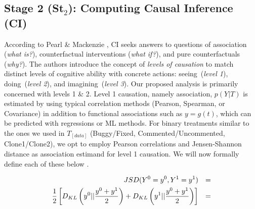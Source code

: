 \subsection{Stage 2 (St$_2$): Computing Causal Inference (CI)}
According to Pearl \& Mackenzie \citep{Pearl2018Causality}, CI seeks answers to questions of association (\textit{what is?}), counterfactual interventions (\textit{what if?}), and pure counterfactuals (\textit{why?}). The authors introduce the concept of \textit{levels of causation} to match distinct levels of cognitive ability with concrete actions: seeing~(\textit{level 1}), doing~(\textit{level 2}), and imagining~(\textit{level 3}). Our proposed analysis is primarily concerned with levels 1 \& 2. Level 1 causation, namely association, $p(Y|T)$ is estimated by using typical correlation methods (\eg Pearson, Spearman, or Covariance) in addition to functional associations such as $y=g(t)$, which can be predicted with regressions or ML methods. For binary treatments similar to the ones we used in $T_{[data]}$ (\eg Buggy/Fixed, Commented/Uncommented, Clone1/Clone2), we opt to employ Pearson correlations and Jensen-Shannon distance as association estimand for level 1 causation. We will now formally define each of these below .


\begin{subequations}
    {%
    \begin{align}
     JSD(Y^{0}=y^0,Y^{1}=y^1) &&= \label{eq:js_divergence-1}\\
     \frac{1}{2}\left[ D_{KL}\left(y^0||\frac{y^0+y^1}{2}\right) + D_{KL}\left(y^1||\frac{y^0+y^1}{2}\right)\right] &&= \label{eq:js_divergence-2}
    \end{align}
    }
\label{eq:js_divergence}
\end{subequations} 

